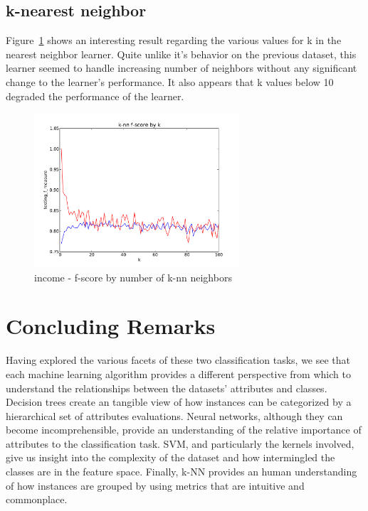 \documentclass{sig-alternate}
\begin{document}
\subsection{k-nearest neighbor}

Figure~\ref{ad-knn-k} shows an interesting result regarding the various values for k in the nearest neighbor learner. Quite unlike it's behavior on the previous dataset, this learner seemed to handle increasing number of neighbors without any significant change to the learner's performance. It also appears that k values below 10 degraded the performance of the learner.


\begin{figure}[!htbp]
    \centering
    \includegraphics[width=3in]{data/adult/k-nn/k.pdf}
    \caption{income - f-score by number of k-nn neighbors\label{ad-knn-k}}
\end{figure} 



\section{Concluding Remarks}

Having explored the various facets of these two classification tasks, we see that each machine learning algorithm provides a different perspective from which to understand the relationships between the datasets' attributes and classes. Decision trees create an tangible view of how instances can be categorized by a hierarchical set of attributes evaluations. Neural networks, although they can become incomprehensible, provide an understanding of the relative importance of attributes to the classification task. SVM, and particularly the kernels involved, give us insight into the complexity of the dataset and how intermingled the classes are in the feature space. Finally, k-NN provides an human understanding of how instances are grouped by using metrics that are intuitive and commonplace.
\end{document}
